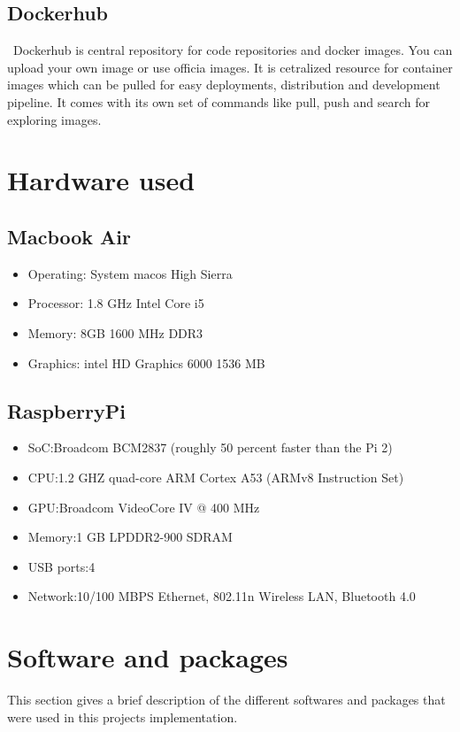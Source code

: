 \subsection{Dockerhub}
~\cite{hid-sp18-413-dockerhub}Dockerhub is central repository for code repositories and docker
images. You can upload your own image or use officia images. It is
cetralized resource for container images which can be pulled for easy
deployments, distribution and development pipeline. It comes with its
own set of commands like pull, push and search for exploring images.

\section{Hardware used}
\subsection{Macbook Air}
\begin{itemize}
\item Operating: System macos High Sierra
\item Processor: 1.8 GHz Intel Core i5
\item Memory: 8GB 1600 MHz DDR3
\item Graphics: intel HD Graphics 6000 1536 MB
\end{itemize}

\subsection{RaspberryPi}
\begin{itemize}
\item SoC:Broadcom BCM2837 (roughly 50 percent faster than the Pi 2)
\item CPU:1.2 GHZ quad-core ARM Cortex A53 (ARMv8 Instruction Set)
\item GPU:Broadcom VideoCore IV @ 400 MHz
\item Memory:1 GB LPDDR2-900 SDRAM
\item USB ports:4
\item Network:10/100 MBPS Ethernet, 802.11n Wireless LAN, Bluetooth
  4.0
\end{itemize}

\section{Software and packages}
This section gives a brief description of the different softwares and
packages that were used in this projects implementation.

